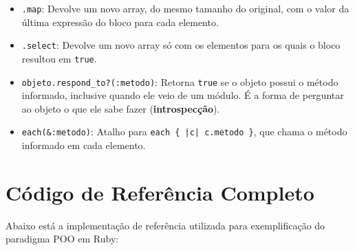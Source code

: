 \begin{itemize}
    \item \texttt{.map}: Devolve um novo array, do mesmo tamanho do original, com o valor da
    última expressão do bloco para cada elemento.

    \item \texttt{.select}: Devolve um novo array só com os elementos para os quais o bloco
    resultou em \texttt{true}.

    \item \texttt{objeto.respond\_to?(:metodo)}: Retorna \texttt{true} se o objeto possui o
    método informado, inclusive quando ele veio de um módulo. É a forma de perguntar ao objeto
    o que ele sabe fazer (\textbf{introspecção}).

    \item \texttt{each(\&:metodo)}: Atalho para \texttt{each \{ |c| c.metodo \}}, que chama o
    método informado em cada elemento.
\end{itemize}

\section{Código de Referência Completo}

Abaixo está a implementação de referência utilizada para exemplificação do paradigma POO em
Ruby:

